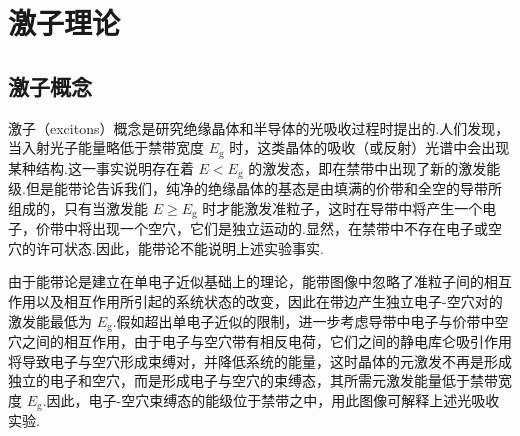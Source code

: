 \chapter{激子理论}

\section{激子概念}

激子（excitons）概念是研究绝缘晶体和半导体的光吸收过程时提出的.人们发现，当入射光子能量略低于禁带宽度 $E_{\mathrm{g}}$ 时，这类晶体的吸收（或反射）光谱中会出现某种结构.这一事实说明存在着 $E<E_{\mathrm{g}}$ 的激发态，即在禁带中出现了新的激发能级.但是能带论告诉我们，纯净的绝缘晶体的基态是由填满的价带和全空的导带所组成的，只有当激发能 $E\geqslant E_{\mathrm{g}}$ 时才能激发准粒子，这时在导带中将产生一个电子，价带中将出现一个空穴，它们是独立运动的.显然，在禁带中不存在电子或空穴的许可状态.因此，能带论不能说明上述实验事实.

由于能带论是建立在单电子近似基础上的理论，能带图像中忽略了准粒子间的相互作用以及相互作用所引起的系统状态的改变，因此在带边产生独立电子-空穴对的激发能最低为 $E_{\mathrm{g}}$.假如超出单电子近似的限制，进一步考虑导带中电子与价带中空穴之间的相互作用，由于电子与空穴带有相反电荷，它们之间的静电库仑吸引作用将导致电子与空穴形成束缚对，并降低系统的能量，这时晶体的元激发不再是形成独立的电子和空穴，而是形成电子与空穴的束缚态，其所需元激发能量低于禁带宽度 $E_{\mathrm{g}}$.因此，电子-空穴束缚态的能级位于禁带之中，用此图像可解释上述光吸收实验.

